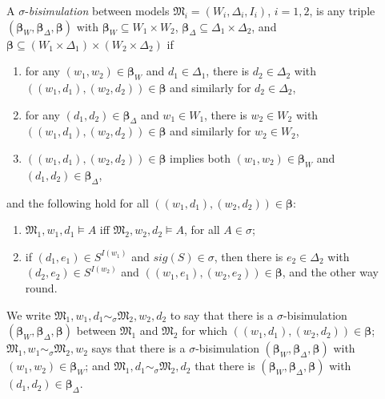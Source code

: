 \documentclass{lmcs} %
\theoremstyle{plain}\newtheorem{satz}[thm]{Satz} %
\newcommand{\nz}[1]{\textcolor{blue}{\bf!}%
	\marginpar[\parbox{15mm}{\raggedleft\scriptsize\textcolor{blue}{#1}}]%
	{\parbox{15mm}{\raggedright\scriptsize\textcolor{blue}{#1}}}}
\newcommand{\sig}{\mathit{sig}}
\newcommand{\bs}{\boldsymbol{\beta}}
\begin{document}
A $\sigma$-\emph{bisimulation} between models $\mathfrak{M}_{i}=(W_{i},\Delta_{i},I_{i})$, $i=1,2$,  is any triple 
$(\bs_{W},\bs_{\Delta},\bs)$ with $\bs_{W}\subseteq W_{1} \times W_{2}$, $\bs_{\Delta}\subseteq \Delta_{1} \times \Delta_{2}$, and $\bs \subseteq (W_{1}\times \Delta_{1}) \times (W_{2} \times \Delta_{2})$ if 
%
\begin{enumerate}[style=multiline,leftmargin=0.7cm]
	\item[\textbf{(w)}] for any $(w_{1},w_{2})\in \bs_{W}$ and $d_{1}\in \Delta_{1}$, there is $d_{2}\in \Delta_{2}$ with $((w_{1},d_{1}),(w_{2},d_{2}))\in \bs$ and similarly for $d_{2}\in \Delta_{2}$,
	
	\item[\textbf{(d)}] for any $(d_{1},d_{2})\in \bs_{\Delta}$ and $w_{1}\in W_{1}$, there is $w_{2}\in W_{2}$ with $((w_{1},d_{1}),(w_{2},d_{2}))\in \bs$ and similarly for \mbox{$w_{2}\in W_{2}$},
	
	\item[\textbf{(c)}] $((w_{1},d_{1}),(w_{2},d_{2})) \in \bs$ implies both	$(w_{1},w_{2}) \in \bs_{W}$ and $(d_{1},d_{2})\in \bs_{\Delta}$,
\end{enumerate}	
%
and the following hold for all $((w_{1},d_{1}),(w_{2},d_{2})) \in \bs$:
%
\begin{enumerate}[style=multiline,leftmargin=0.7cm]
	\item[\textbf{(a)}] $\mathfrak M_{1},w_{1},d_{1} \models A $ iff 
	$\mathfrak M_{2},w_{2},d_{2} \models A$, for all $A\in \sigma$;
	
	\item[\textbf{(r)}] if $(d_{1},e_{1})\in S^{I(w_1)}$ and $\sig(S)\in \sigma$, then there is $e_{2}\in \Delta_{2}$ with $(d_{2}, e_{2})\in S^{I(w_2)}$ and
	$((w_{1},e_{1}),(w_{2},e_{2}))\in \bs$, and the other way round.
   
\end{enumerate}
%
We write $\mathfrak{M}_{1},w_{1},d_{1}\sim_{\sigma} \mathfrak{M}_{2},w_{2},d_{2}$ to say that there is a $\sigma$-bisimulation $(\bs_{W},\bs_{\Delta},\bs)$ between $\mathfrak{M}_1$ and $\mathfrak{M}_{2}$ for which $((w_{1},d_{1}),(w_{2},d_{2}))\in \bs$; 
$\mathfrak{M}_{1},w_{1}\sim_{\sigma} \mathfrak{M}_{2},w_{2}$ says that there is a $\sigma$-bisimulation $(\bs_{W},\bs_{\Delta},\bs)$ with $(w_{1},w_{2})\in \bs_{W}$; and $\mathfrak{M}_{1},d_{1}\sim_{\sigma} \mathfrak{M}_{2},d_{2}$ that there is $(\bs_{W},\bs_{\Delta},\bs)$ with $(d_{1},d_{2})\in \bs_{\Delta}$. 
\end{document}
